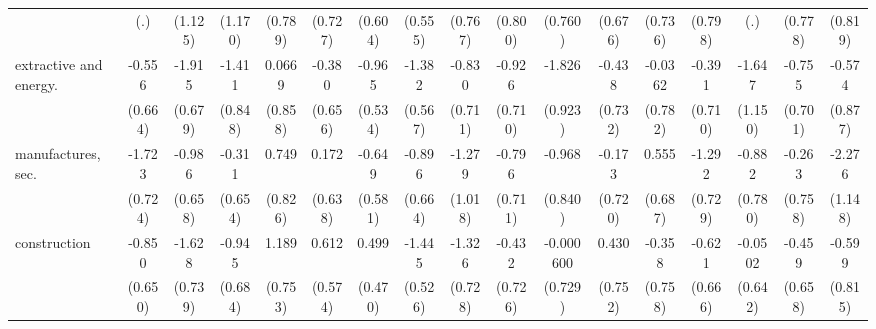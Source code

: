 {\begin{tabular}{l*{16}{c}}
                    &         (.)         &     (1.125)         &     (1.170)         &     (0.789)         &     (0.727)         &     (0.604)         &     (0.555)         &     (0.767)         &     (0.800)         &     (0.760)         &     (0.676)         &     (0.736)         &     (0.798)         &         (.)         &     (0.778)         &     (0.819)         \\
[1em]
extractive and energy.&      -0.556         &      -1.915\sym{**} &      -1.411         &      0.0669         &      -0.380         &      -0.965         &      -1.382\sym{*}  &      -0.830         &      -0.926         &      -1.826\sym{*}  &      -0.438         &     -0.0362         &      -0.391         &      -1.647         &      -0.755         &      -0.574         \\
                    &     (0.664)         &     (0.679)         &     (0.848)         &     (0.858)         &     (0.656)         &     (0.534)         &     (0.567)         &     (0.711)         &     (0.710)         &     (0.923)         &     (0.732)         &     (0.782)         &     (0.710)         &     (1.150)         &     (0.701)         &     (0.877)         \\
[1em]
manufactures, sec.  &      -1.723\sym{*}  &      -0.986         &      -0.311         &       0.749         &       0.172         &      -0.649         &      -0.896         &      -1.279         &      -0.796         &      -0.968         &      -0.173         &       0.555         &      -1.292         &      -0.882         &      -0.263         &      -2.276\sym{*}  \\
                    &     (0.724)         &     (0.658)         &     (0.654)         &     (0.826)         &     (0.638)         &     (0.581)         &     (0.664)         &     (1.018)         &     (0.711)         &     (0.840)         &     (0.720)         &     (0.687)         &     (0.729)         &     (0.780)         &     (0.758)         &     (1.148)         \\
[1em]
construction        &      -0.850         &      -1.628\sym{*}  &      -0.945         &       1.189         &       0.612         &       0.499         &      -1.445\sym{**} &      -1.326         &      -0.432         &   -0.000600         &       0.430         &      -0.358         &      -0.621         &     -0.0502         &      -0.459         &      -0.599         \\
                    &     (0.650)         &     (0.739)         &     (0.684)         &     (0.753)         &     (0.574)         &     (0.470)         &     (0.526)         &     (0.728)         &     (0.726)         &     (0.729)         &     (0.752)         &     (0.758)         &     (0.666)         &     (0.642)         &     (0.658)         &     (0.815)         \\

\end{tabular}}
